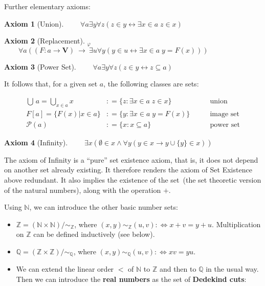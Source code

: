 \documentclass{article}
\newcommand{\Nat}{\mathbb{N}}
\newcommand{\Integer}{\mathbb{Z}}
\newcommand{\Rat}{\mathbb{Q}}
\newtheorem{axiom}{Axiom}[section]
\begin{document}
Further elementary axioms:

\begin{axiom}[Union]$\qquad \forall a \exists y \forall z (z \in y  \leftrightarrow  \exists x \in a \; z \in x)$

\end{axiom}\begin{axiom}[Replacement]\textbf{$_{{}\varphi}$}\\
$\qquad \forall a  ((F: a \to \mathbf{V}) \: \rightarrow \: \exists u \forall y (y \in u \leftrightarrow \exists x \in a \; y = F(x)))$

\end{axiom}\begin{axiom}[Power Set]$\qquad \forall a \exists y \forall z (z \in y \leftrightarrow z \subseteq a)$

\end{axiom}It follows that, for a given set $a$, the following classes are sets:

\begin{align*}
\bigcup \, a = \bigcup_{x \in a} x & : = \{z \colon \exists x \in a \; z \in x \}  &  \qquad  \text{union}\\
F[a] = \{F(x)|x \in a\} &: = \{y\colon \exists x \in a \; y = F(x) \}  &  \qquad  \text{image set}\\
\mathcal{P}(a) &: = \{x\colon x \subseteq a\} & \qquad  \text{power set}
\end{align*}

\begin{axiom}[Infinity]$\qquad \exists x ( \emptyset \in x \wedge \forall y ( y \in x \to y \cup \{y\} \in x))$

\end{axiom}The axiom of Infinity is a ``pure'' set existence axiom, that is, it does not depend on another set already existing. It therefore renders the axiom of Set Existence above redundant.
It also implies the existence of the set~{}\omega (the set theoretic version of the natural numbers), along with the operation $+$.

Using $\Nat$, we can introduce the other basic number sets:

\begin{itemize}
\item $\Integer = (\Nat\times\Nat)/ \sim_\Integer$, where $(x,y) \sim_\Integer (u,v) :\Leftrightarrow  x+v = y+u$. Multiplication on $\Integer$ can be defined inductively (see below).
\item $\Rat = (\Integer\times\Integer)/\sim_\Rat$, where $(x,y) \sim_\Rat (u,v) :\Leftrightarrow xv = yu$.
\item We can extend the linear order $<$ of $\Nat$ to $\Integer$ and then to $\Rat$ in the usual way. Then we can introduce the \textbf{real numbers} as the set of \textbf{Dedekind cuts}:
\end{itemize}
\end{document}

